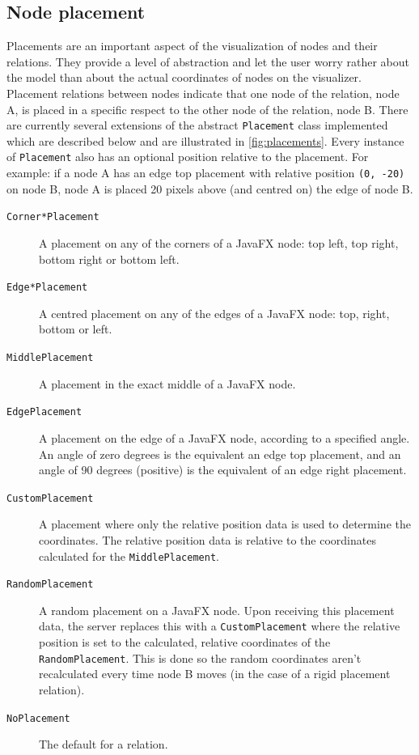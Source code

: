 \subsection{Node placement}\label{sec:features;sub:placement}
Placements are an important aspect of the visualization of nodes and their relations. They provide a level of abstraction and let the user worry rather about the model than about the actual coordinates of nodes on the visualizer. Placement relations between nodes indicate that one node of the relation, node A, is placed in a specific respect to the other node of the relation, node B. There are currently several extensions of the abstract \lstinline{Placement} class implemented which are described below and are illustrated in \cref{fig:placements}. Every instance of \lstinline{Placement} also has an optional position relative to the placement. For example: if a node A has an edge top placement with relative position \lstinline{(0, -20)} on node B, node A is placed 20 pixels above (and centred on) the edge of node B.
\begin{description}
\item[\texttt{Corner*Placement}] A placement on any of the corners of a JavaFX node: top left, top right, bottom right or bottom left.
\item[\texttt{Edge*Placement}]  A centred placement on any of the edges of a JavaFX node: top, right, bottom or left.
\item[\texttt{MiddlePlacement}] A placement in the exact middle of a JavaFX node.
\item[\texttt{EdgePlacement}]   A placement on the edge of a JavaFX node, according to a specified angle. An angle of zero degrees is the equivalent an edge top placement, and an angle of 90 degrees (positive) is the equivalent of an edge right placement. 
\item[\texttt{CustomPlacement}] A placement where only the relative position data is used to determine the coordinates. The relative position data is relative to the coordinates calculated for the \lstinline{MiddlePlacement}.
\item[\texttt{RandomPlacement}] A random placement on a JavaFX node. Upon receiving this placement data, the server replaces this with a \lstinline{CustomPlacement} where the relative position is set to the calculated, relative coordinates of the \lstinline{RandomPlacement}. This is done so the random coordinates aren't recalculated every time node B moves (in the case of a rigid placement relation).
\item[\texttt{NoPlacement}] The default for a relation.
\end{description}
